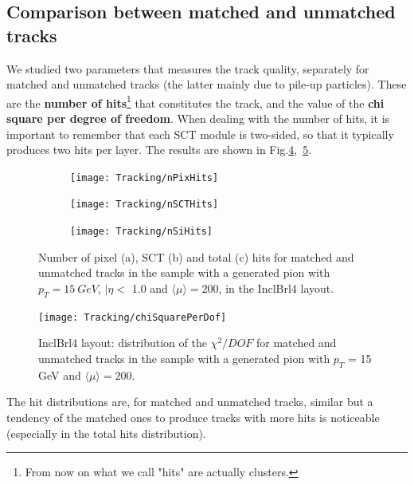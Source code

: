 \documentclass[a4paper,twoside,12pt]{book}
\begin{document}
\subsection{Comparison between matched and unmatched tracks}

We studied two parameters that measures the track quality, separately for matched and unmatched tracks (the latter mainly due to pile-up particles). These
are the \textbf{number of hits}\footnote{From now on what we call "hits" are actually clusters.} that constitutes the track, and the value of the \textbf{chi square per degree of freedom}. When dealing with the number
of hits, it is important to remember that each SCT module is two-sided, so that it typically produces two hits per layer. The results are shown in \mbox{Fig.\ref{fig:tracking:nHits}, \ref{fig:tracking:chiSquare}}. \\

\begin{figure}
\begin{subfigure}{\linewidth}
\centering
\texttt{[image: Tracking/nPixHits]}
\caption{}
\label{fig:tracking:nPixHits}
\end{subfigure}

\begin{subfigure}{\linewidth}
\centering
\texttt{[image: Tracking/nSCTHits]}
\caption{}
\label{fig:tracking:nSCTHits}
\end{subfigure}

\begin{subfigure}{\linewidth}
\centering
\texttt{[image: Tracking/nSiHits]}
\caption{}
\label{fig:tracking:nSiHits}
\end{subfigure}
\caption{Number of pixel (a), SCT (b) and total (c) hits for matched and unmatched tracks in the sample with a generated pion with $p_{T} = 15\ GeV$, $|\eta <$ 1.0 and $\langle\mu\rangle = 200$, in the InclBrl4 layout.}
\label{fig:tracking:nHits}
\end{figure}

\begin{figure}
\centering
\texttt{[image: Tracking/chiSquarePerDof]}
\caption{InclBrl4 layout: distribution of the $\chi^2/DOF$ for matched and unmatched tracks in the sample with a generated pion with $p_{T}$ = 15 GeV and $\langle\mu\rangle = 200$.}
\label{fig:tracking:chiSquare}
\end{figure}

The hit distributions are, for matched and unmatched tracks, similar but a tendency of the matched ones to produce tracks with more hits is noticeable (especially in the total hits distribution). \\
\end{document}
